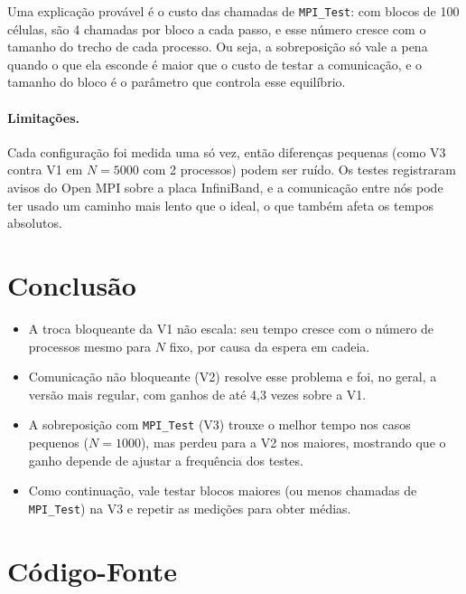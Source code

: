 \documentclass[a4paper,12pt]{article}
\begin{document}
Uma explicação
provável é o custo das chamadas de \texttt{MPI\_Test}: com blocos de 100
células, são 4 chamadas por bloco a cada passo, e esse número cresce com o
tamanho do trecho de cada processo. Ou seja, a sobreposição só vale a
pena quando o que ela esconde é maior que o custo de testar a comunicação, e
o tamanho do bloco é o parâmetro que controla esse equilíbrio.

\paragraph{Limitações.}
Cada configuração foi medida uma só vez, então diferenças pequenas (como
V3 contra V1 em $N=5000$ com 2 processos) podem ser ruído. Os testes
registraram avisos do Open MPI sobre a placa InfiniBand, e a comunicação
entre nós pode ter usado um caminho mais lento que o ideal, o que também
afeta os tempos absolutos.

\section{Conclusão}

\begin{itemize}
    \item A troca bloqueante da V1 não escala: seu tempo cresce com o número
          de processos mesmo para $N$ fixo, por causa da espera em cadeia.
    \item Comunicação não bloqueante (V2) resolve esse problema e foi, no
          geral, a versão mais regular, com ganhos de até 4,3 vezes sobre a V1.
    \item A sobreposição com \texttt{MPI\_Test} (V3) trouxe o melhor tempo
          nos casos pequenos ($N=1000$), mas perdeu para a V2 nos maiores,
          mostrando que o ganho depende de ajustar a frequência dos testes.
    \item Como continuação, vale testar blocos maiores (ou menos chamadas de
          \texttt{MPI\_Test}) na V3 e repetir as medições para obter médias.
\end{itemize}

\newpage
\appendix

\section{Código-Fonte}


\end{document}
